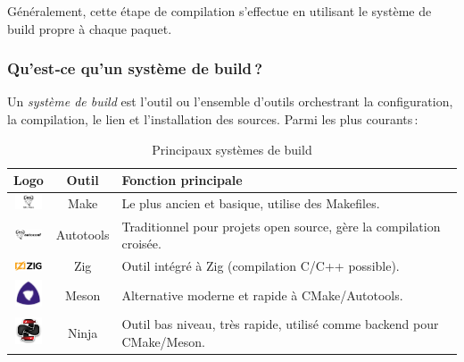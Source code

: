 Généralement, cette étape de compilation s’effectue en utilisant le système de build propre à chaque paquet.

\subsubsection{Qu’est‑ce qu’un système de build ?}
\label{sssec:definition-buildsystem}

Un \emph{système de build} est l’outil ou l’ensemble d’outils orchestrant la configuration, la compilation, le lien et l’installation des sources. Parmi les plus courants :

\begin{table}[h!]
    \centering
    \begin{tabular}{|c|c|p{8cm}|}
        \hline
        \textbf{Logo} & \textbf{Outil} & \textbf{Fonction principale} \\
        \hline
        \includegraphics[width=0.8cm]{images_pfe/make.png} & Make & Le plus ancien et basique, utilise des Makefiles. \\
        \hline
        \includegraphics[width=0.8cm]{images_pfe/GNU-Autoconf-768x288.jpg} & Autotools & Traditionnel pour projets open source, gère la compilation croisée. \\
        \hline
        \includegraphics[width=0.8cm]{images_pfe/zig.png} & Zig & Outil intégré à Zig (compilation C/C++ possible). \\
        \hline
        \includegraphics[width=0.8cm]{images_pfe/meson_logo.png} & Meson & Alternative moderne et rapide à CMake/Autotools. \\
        \hline
        \includegraphics[width=0.8cm]{images_pfe/ninja.jpeg} & Ninja & Outil bas niveau, très rapide, utilisé comme backend pour CMake/Meson. \\
        \hline
    \end{tabular}
    \caption{Principaux systèmes de build}
    \label{tab:build_tools_logos}
\end{table}

